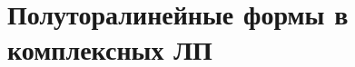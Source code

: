 \documentclass[../main.tex]{subfiles}
\begin{document}
\chapter{Полуторалинейные формы в комплексных ЛП} 

\end{document}

